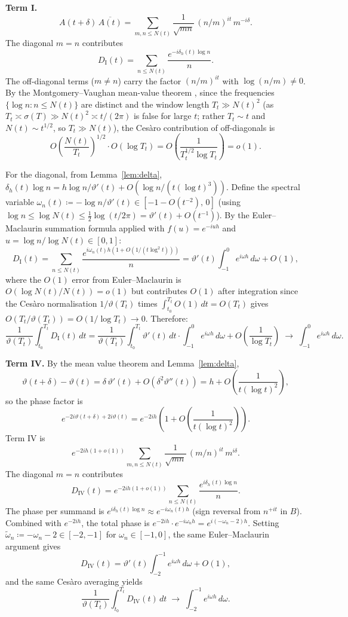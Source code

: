 \documentclass{amsart}
\newcommand{\assign}{\coloneqq}
\begin{document}
\medskip
\noindent\textbf{Term I.}\enspace
\[
  A(t+\delta)\,\overline{A(t)}
  = \sum_{m,n\le N(t)} \frac{1}{\sqrt{mn}}\,(n/m)^{it}\,m^{-i\delta}.
\]
The diagonal $m=n$ contributes
\begin{equation}\label{eq:DI}
  D_{\mathrm{I}}(t) = \sum_{n\le N(t)} \frac{e^{-i\delta_h(t)\log n}}{n}.
\end{equation}
The off-diagonal terms ($m\ne n$) carry the factor $(n/m)^{it}$ with
$\log(n/m)\ne 0$. By the Montgomery--Vaughan mean-value theorem
\cite{MontgomeryVaughan1974}, since the frequencies $\{\log n : n\le N(t)\}$
are distinct and the window length $T_t \gg N(t)^2$ (as $T_t \asymp \sigma(T)
\gg N(t)^2 \asymp t/(2\pi)$ is false for large $t$; rather $T_t \sim t$ and
$N(t)\sim t^{1/2}$, so $T_t \gg N(t)$), the Ces\`aro contribution of
off-diagonals is
\[
  O\!\left(\frac{N(t)}{T_t}\right)^{1/2}\cdot O(\log T_t)
  = O\!\left(\frac{1}{T_t^{1/2}\log T_t}\right) = o(1).
\]

For the diagonal, from Lemma~\ref{lem:delta},
$\delta_h(t)\log n = h\log n/\vartheta'(t) + O(\log n/(t(\log t)^3))$.
Define the spectral variable $\omega_n(t) \assign -\log n/\vartheta'(t) \in [-1-O(t^{-2}),\,0]$
(using $\log n \le \log N(t) \le \tfrac{1}{2}\log(t/2\pi) = \vartheta'(t) + O(t^{-1})$).
By the Euler--Maclaurin summation formula applied with $f(u) = e^{-iuh}$ and
$u = \log n/\log N(t) \in [0,1]$:
\[
  D_{\mathrm{I}}(t) = \sum_{n\le N(t)}\frac{e^{i\omega_n(t)h(1+O(1/(t\log^2 t)))}}{n}
  = \vartheta'(t)\int_{-1}^0 e^{i\omega h}\,d\omega + O(1),
\]
where the $O(1)$ error from Euler--Maclaurin is $O(\log N(t)/N(t)) = o(1)$ but
contributes $O(1)$ after integration since the Ces\`aro normalisation
$1/\vartheta(T_t)$ times $\int_{t_0}^{T_t} O(1)\,dt = O(T_t)$ gives $O(T_t/\vartheta(T_t))
= O(1/\log T_t) \to 0$. Therefore:
\[
  \frac{1}{\vartheta(T_t)}\int_{t_0}^{T_t} D_{\mathrm{I}}(t)\,dt
  = \frac{1}{\vartheta(T_t)}\int_{t_0}^{T_t}\vartheta'(t)\,dt\cdot\int_{-1}^0 e^{i\omega h}\,d\omega
  + O\!\left(\frac{1}{\log T_t}\right)
  \;\to\; \int_{-1}^0 e^{i\omega h}\,d\omega.
\]

\medskip
\noindent\textbf{Term IV.}\enspace
By the mean value theorem and Lemma~\ref{lem:delta},
\[
  \vartheta(t+\delta) - \vartheta(t) = \delta\,\vartheta'(t) + O(\delta^2\vartheta''(t))
  = h + O\!\left(\frac{1}{t(\log t)^2}\right),
\]
so the phase factor is
\[
  e^{-2i\vartheta(t+\delta)+2i\vartheta(t)} = e^{-2ih}\!\left(1 + O\!\left(\frac{1}{t(\log t)^2}\right)\right).
\]
Term IV is
\[
  e^{-2ih(1+o(1))}\sum_{m,n\le N(t)}\frac{1}{\sqrt{mn}}\,(m/n)^{it}\,m^{i\delta}.
\]
The diagonal $m=n$ contributes
\[
  D_{\mathrm{IV}}(t) = e^{-2ih(1+o(1))}\sum_{n\le N(t)}\frac{e^{i\delta_h(t)\log n}}{n}.
\]
The phase per summand is $e^{i\delta_h(t)\log n} \approx e^{-i\omega_n(t)h}$
(sign reversal from $n^{+it}$ in $B$). Combined with $e^{-2ih}$, the total phase is
$e^{-2ih}\cdot e^{-i\omega_n h} = e^{i(-\omega_n-2)h}$.
Setting $\tilde\omega_n \assign -\omega_n - 2 \in [-2,-1]$ for $\omega_n \in [-1,0]$,
the same Euler--Maclaurin argument gives
\[
  D_{\mathrm{IV}}(t) = \vartheta'(t)\int_{-2}^{-1} e^{i\omega h}\,d\omega + O(1),
\]
and the same Ces\`aro averaging yields
\[
  \frac{1}{\vartheta(T_t)}\int_{t_0}^{T_t} D_{\mathrm{IV}}(t)\,dt
  \;\to\; \int_{-2}^{-1} e^{i\omega h}\,d\omega.
\]
\end{document}
